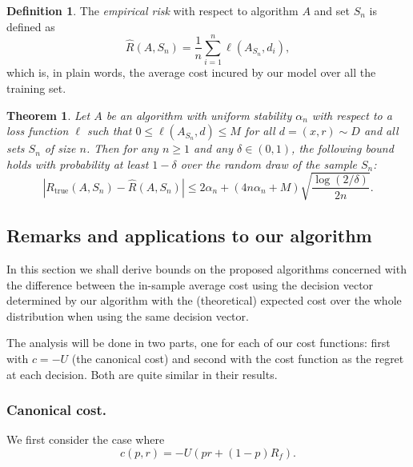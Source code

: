 \documentclass[11pt]{article}
\theoremstyle{plain}
\newtheorem{thm}{Theorem}
\theoremstyle{definition}
\newtheorem*{deff}{Definition}
\begin{document}
\begin{deff}
  The \emph{empirical risk} with respect to algorithm $A$ and set $S_n$ is defined as
  \begin{equation}
    \hat R(A,S_n) = \frac{1}{n} \sum_{i=1}^n \ell(A_{S_n},d_i),
  \end{equation}
  which is, in plain words, the average cost incured by our model over all the training
  set.
\end{deff}

\begin{thm}
  \label{thm2}
  Let $A$ be an algorithm with uniform stability $\alpha_n$ with respect to a loss
  function $\ell$ such that $0\leq\ell(A_{S_n},d)\leq M$ for all $d=(x,r)\sim D$ and all sets
  $S_n$ of size $n$. Then for any $n\geq1$ and any $\delta\in(0,1)$, the following bound
  holds with probability at least $1-\delta$ over the random draw of the sample $S_n$:
  \begin{equation}
    |R_{\mathrm{true}}(A,S_n) - \hat R(A,S_n)| \leq 2\alpha_n + (4n\alpha_n + M) \sqrt{\frac{\log(2/\delta)}{2n}}.
  \end{equation}
\end{thm}

\subsection{Remarks and applications to our algorithm}

In this section we shall derive bounds on the proposed algorithms concerned with the
difference between the in-sample average cost using the decision vector determined by our
algorithm with the (theoretical) expected cost over the whole distribution when using the
same decision vector. 

The analysis will be done in two parts, one for each of our cost functions: first with
$c=-U$ (the canonical cost) and second with the cost function as the regret at each
decision. Both are quite similar in their results. 

\subsubsection{Canonical cost.}

We first consider the case where 
\begin{equation}
  c(p,r) = -U(pr + (1-p)R_f).
\end{equation}
\end{document}
